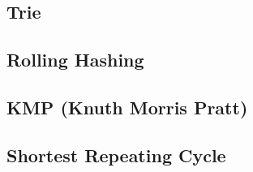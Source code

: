 \documentclass[10pt,landscape,twocolumn,a4paper,notitlepage]{article}
\begin{document}
  \subsection{Trie}
  

  \subsection{Rolling Hashing}
  

  \subsection{KMP (Knuth Morris Pratt)}
  

  \subsection{Shortest Repeating Cycle}
  
\end{document}

